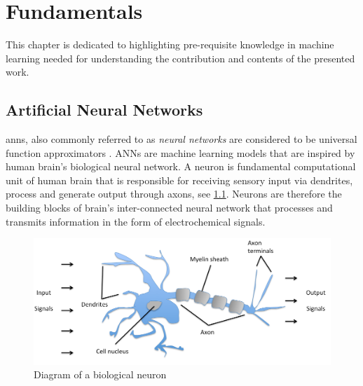 
\chapter{Fundamentals}
\label{sec:fundamentals}

This chapter is dedicated to highlighting pre-requisite knowledge in machine learning needed for understanding the contribution and contents of the presented work.

\section{Artificial Neural Networks}

\gls{anns}, also commonly referred to as \textit{neural networks} are considered to  be universal function approximators \cite{Hornik1989}. ANNs are machine learning models that are inspired by human brain's biological neural network. A neuron is fundamental computational unit of human brain that is responsible for receiving sensory input via dendrites, process and generate output through axons, see \ref{fig: neuron}. Neurons are therefore the building blocks of brain's inter-connected neural network that processes and transmits information in the form of electrochemical signals. 


\begin{figure}[!htb]
	 \centering 
\includegraphics[scale = 0.35]{Graphics/Fundamentals/neuron3x} 
	\caption{Diagram of a biological neuron \cite{RTS20}} 
	\label{fig: neuron} 
\end{figure}



